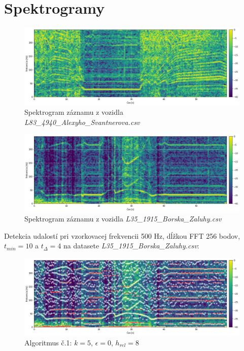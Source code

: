 \thispagestyle{empty}
\setcounter{figure}{0}
\chapter{Spektrogramy} \label{appendix:spectrogram}
\renewcommand*{\thepage}{D-\arabic{page}}
     
\begin{figure}[h]
	\centering
    \includegraphics[width=\textwidth]{figures/verification/L83-dataset-spectrum.png}
	\caption{Spektrogram záznamu z vozidla \emph{L83\_4940\_Alexyho\_Svantnerova.csv}}
\end{figure}

\begin{figure}[h]
	\centering
    \includegraphics[width=\textwidth]{figures/verification/L35-dataset-spectrum.png}
    \caption{Spektrogram záznamu z vozidla \emph{L35\_1915\_Borska\_Zaluhy.csv}}
\end{figure}

Detekcia udalostí pri vzorkovacej frekvencii 500 Hz, dĺžkou FFT 256 bodov,
$t_{min} = 10$ a $t_{\Delta} = 4$ na datasete \emph{L35\_1915\_Borska\_Zaluhy.csv}:

\begin{figure}[h]
	\centering
    \includegraphics[width=\textwidth]{figures/verification/L35-dataset-A1.png}
    \caption{Algoritmus č.1: $k = 5$, $\epsilon = 0$, $h_{rel} = 8$}
\end{figure}

